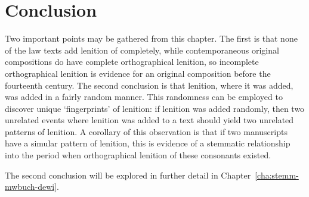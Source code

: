 \section{Conclusion}
\label{sec:lawconclus}
Two important points may be gathered from this chapter. The first is that none of the law texts add lenition of  completely, while contemporaneous original compositions do have complete orthographical lenition, so incomplete orthographical lenition is evidence for an original composition before the fourteenth century. The second conclusion is that lenition, where it was added, was added in a fairly random manner. This randomness can be employed to discover unique `fingerprints' of lenition: if lenition was added randomly, then two unrelated events where lenition was added to a text should yield two unrelated patterns of lenition. A corollary of this observation is that if two manuscripts have a simular pattern of lenition, this is evidence of a stemmatic relationship into the period when orthographical lenition of these consonants existed.

The second conclusion will be explored in further detail in Chapter~\ref{cha:stemm-mwbuch-dewi}.







